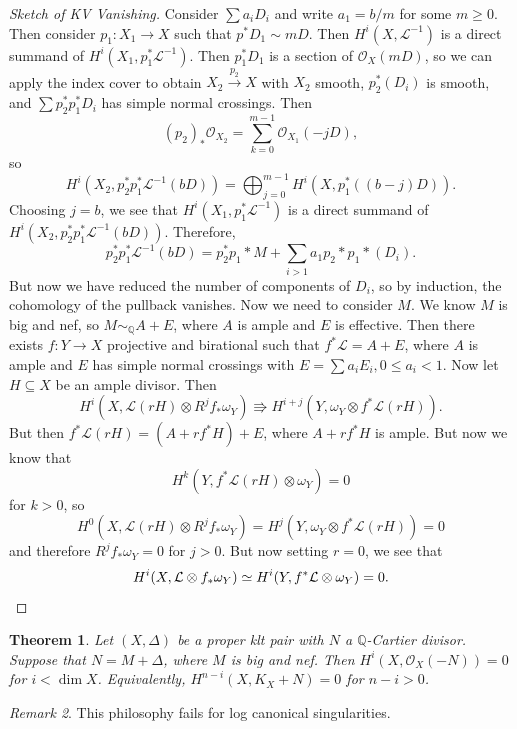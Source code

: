 \documentclass[leqno, openany]{memoir}
\newtheorem{thm}{Theorem}[section]
\theoremstyle{definition}
\theoremstyle{remark}
\newtheorem{rmk}[thm]{Remark}
\theoremstyle{plain}
\theoremstyle{definition}
\theoremstyle{remark}
\newcommand{\Q}{\mathbb{Q}}
\newcommand{\mc}[1]{\mathcal{#1}}
\begin{document}
\begin{proof}[Sketch of KV Vanishing]
    Consider $\sum a_i D_i$ and write $a_1 = b/m$ for some $m \geq 0$. Then consider $p_1 \colon X_1 \to X$ such that $p^* D_1 \sim m D$. Then $H^i(X, \mc{L}^{-1})$ is a direct summand of $H^i(X_1, p_1^* \mc{L}^{-1})$. Then $p_1^* D_1$ is a section of $\mc{O}_X(mD)$, so we can apply the index cover to obtain $X_2 \xrightarrow{p_2} X$ with $X_2$ smooth, $p_2^* (D_i)$ is smooth, and $\sum p_2^* p_1^* D_i$ has simple normal crossings. Then
    \[ {(p_2)}_* \mc{O}_{X_2} = \sum_{k=0}^{m-1} \mc{O}_{X_1}(-j D), \]
    so
    \[ H^i(X_2, p_2^* p_1^* \mc{L}^{-1}(b D)) = \bigoplus_{j=0}^{m-1} H^i(X, p_1^* ((b-j)D)). \]
    Choosing $j = b$, we see that $H^i(X_1, p_1^* \mc{L}^{-1})$ is a direct summand of $H^i(X_2, p_2^* p_1^* \mc{L}^{-1}(bD))$. Therefore, 
    \[ p_2^* p_1^* \mc{L}^{-1}(bD) = p_2^* p_1* M + \sum_{i > 1} a_1 p_2* p_1* (D_i). \]
    But now we have reduced the number of components of $D_i$, so by induction, the cohomology of the pullback vanishes. Now we need to consider $M$. We know $M$ is big and nef, so $M \sim_{\Q} A + E$, where $A$ is ample and $E$ is effective. Then there exists $f \colon Y \to X$ projective and birational such that $f^* \mc{L} = A + E$, where $A$ is ample and $E$ has simple normal crossings with $E = \sum a_i E_i, 0 \leq a_i < 1$. Now let $H \subseteq X$ be an ample divisor. Then
    \[ H^i(X, \mc{L}(rH) \otimes R^j f_* \omega_Y) \Rrightarrow H^{i+j}(Y, \omega_Y \otimes f^* \mc{L}(rH)). \]
    But then $f^* \mc{L}(rH) = (A + r f^* H) + E$, where $A + rf^* H$ is ample. But now we know that
    \[ H^k(Y, f^* \mc{L}(rH) \otimes \omega_Y) = 0 \]
    for $k > 0$, so 
    \[ H^0(X, \mc{L}(rH) \otimes R^j f_* \omega_Y) = H^j(Y, \omega_Y \otimes f^* \mc{L}(rH)) = 0 \]
    and therefore $R^j f_* \omega_Y = 0$ for $j > 0$. But now setting $r = 0$, we see that
    \[ H^i(X, \mc{L} \otimes f_* \omega_Y) \simeq H^i(Y, f^* \mc{L} \otimes \omega_Y) = 0. \qedhere \]
\end{proof}

\begin{thm}
    Let $(X, \Delta)$ be a proper klt pair with $N$ a $\Q$-Cartier divisor. Suppose that $N = M + \Delta$, where $M$ is big and nef. Then $H^i(X, \mc{O}_X(-N)) = 0$ for $i < \dim X$. Equivalently, $H^{n-i}(X, K_X + N) = 0$ for $n-i > 0$.
\end{thm}

\begin{rmk}
    This philosophy fails for log canonical singularities.
\end{rmk}
\end{document}
